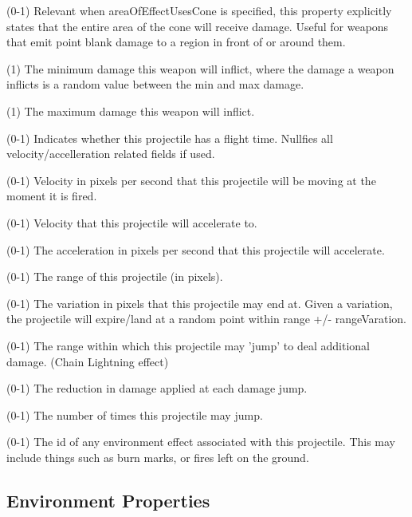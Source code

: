 \begin{description}
\item {} (0-1)  Relevant when areaOfEffectUsesCone is specified, this property explicitly states that the entire area of the cone will receive damage.  Useful for weapons that emit point blank damage to a region in front of or around them.
\item {} (1)  The minimum damage this weapon will inflict, where the damage a weapon inflicts is a random value between the min and max damage.
\item {} (1)  The maximum damage this weapon will inflict.
\item {} (0-1)  Indicates whether this projectile has a flight time.  Nullfies all velocity/accelleration related fields if used.
\item {} (0-1)  Velocity in pixels per second that this projectile will be moving at the moment it is fired.
\item {} (0-1)  Velocity that this projectile will accelerate to.
\item {} (0-1)  The acceleration in pixels per second that this projectile will accelerate.
\item {} (0-1)  The range of this projectile (in pixels).
\item {} (0-1)  The variation in pixels that this projectile may end at.  Given a variation, the projectile will expire/land at a random point within range +/- rangeVaration.
\item {} (0-1)  The range within which this projectile may 'jump' to deal additional damage. (Chain Lightning effect)
\item {} (0-1)  The reduction in damage applied at each damage jump.
\item {} (0-1)  The number of times this projectile may jump.
\item {} (0-1)  The id of any environment effect associated with this projectile.  This may include things such as burn marks, or fires left on the ground.
\end{description}
\subsection{Environment Properties}

